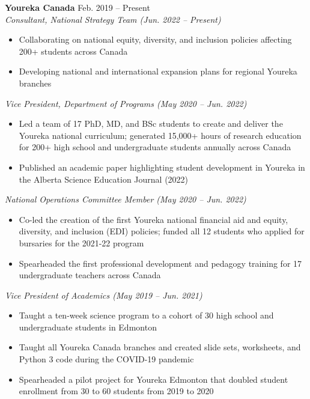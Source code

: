 \documentclass{article}
\begin{document}
\textbf{Youreka Canada} \hfill Feb. 2019 -- Present \\
\textit{Consultant, National Strategy Team (Jun. 2022 -- Present)}
\begin{itemize}
    \item Collaborating on national equity, diversity, and inclusion policies affecting 200+ students across Canada
    \item Developing national and international expansion plans for regional Youreka branches
\end{itemize} \vspace{1em}
\textit{Vice President, Department of Programs (May 2020 -- Jun. 2022)}
\begin{itemize}
    \item Led a team of 17 PhD, MD, and BSc students to create and deliver the Youreka national curriculum; generated 15,000+ hours of research education for 200+ high school and undergraduate students annually across Canada
    \item Published an academic paper highlighting student development in Youreka in the Alberta Science Education Journal (2022)
\end{itemize} \vspace{1em}
\textit{National Operations Committee Member (May 2020 -- Jun. 2022)}
\begin{itemize}
    \item Co-led the creation of the first Youreka national financial aid and equity, diversity, and inclusion (EDI) policies; funded all 12 students who applied for bursaries for the 2021-22 program
    \item Spearheaded the first professional development and pedagogy training for 17 undergraduate teachers across Canada
\end{itemize} \vspace{1em}
\textit{Vice President of Academics (May 2019 -- Jun. 2021)}
\begin{itemize}
    \item Taught a ten-week science program to a cohort of 30 high school and undergraduate students in Edmonton
    \item Taught all Youreka Canada branches and created slide sets, worksheets, and Python 3 code during the COVID-19 pandemic
    \item Spearheaded a pilot project for Youreka Edmonton that doubled student enrollment from 30 to 60 students from 2019 to 2020
\end{itemize} \vspace{1em}
\end{document}
